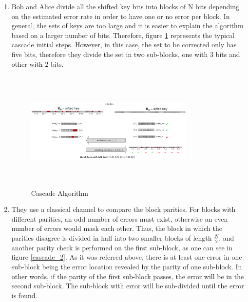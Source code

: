 \begin{enumerate}
\begin{enumerate}
        \item Bob and Alice divide all the shifted key bits into blocks of N bits depending on the estimated error rate in order to have one or no error per block. In general, the sets of keys are too large and it is easier to explain the algorithm based on a larger number of bits. Therefore, figure \ref{cascade_1} represents the typical cascade initial steps. However, in this case, the set to be corrected only has five bits, therefore they divide the set in two sub-blocks, one with $3$ bits and other with $2$ bits.

             \begin{figure}[h]
            	\centering
            	\includegraphics[width=0.8\textwidth, height=6cm]{./sdf/ot_with_discrete_variables/figures/cascade_1.png}
                	\caption{Cascade Algorithm}\label{cascade_1}
            \end{figure}

        \item They use a classical channel to compare the block parities. For blocks with different parities, an odd number of errors must exist, otherwise an even number of errors would mask each other. Thus, the block in which the parities disagree is divided in half into two smaller blocks of length $\frac{N}{2}$, and another parity check is performed on the first sub-block, as one can see in figure \ref{cascade_2}. As it was referred above, there is at least one error in one sub-block being the error location revealed by the parity of one sub-block. In other words, if the parity of the first sub-block passes, the error will be in the second sub-block. The sub-block with error will be sub-divided until the error is found.


\end{enumerate}
\end{enumerate}
